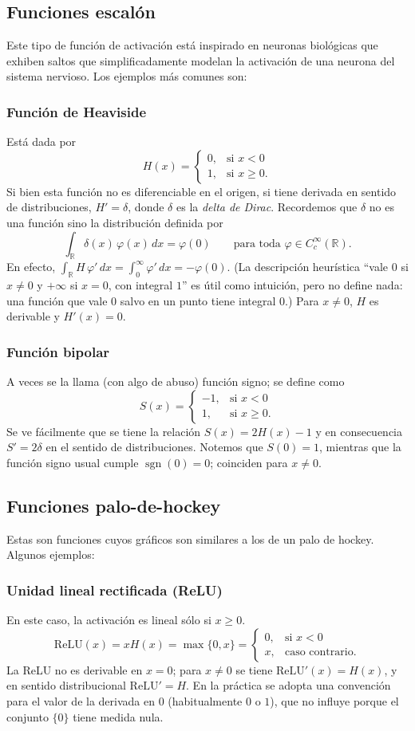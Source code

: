 \documentclass[12pt, a4paper]{amsbook}
\newcommand{\R}{{\mathbb R}}
\theoremstyle{remark}
\theoremstyle{definition}
\numberwithin{section}{chapter}
\numberwithin{subsection}{section}
\numberwithin{equation}{section}
\numberwithin{figure}{chapter}
\begin{document}
\subsection*{Funciones escalón} Este tipo de función de activación está inspirado en neuronas biológicas que exhiben saltos que simplificadamente modelan la activación de una neurona del sistema nervioso. Los ejemplos más comunes son:
\subsubsection*{Función de Heaviside} Está dada por
$$
H(x)=\begin{cases}
0, &\text{si } x<0\\
1, &\text{si } x\ge 0.
\end{cases}
$$
Si bien esta función no es diferenciable en el origen, si tiene derivada en sentido de distribuciones, $H'=\delta$, donde $\delta$ es la {\em delta de Dirac}. Recordemos que $\delta$ no es una función sino la distribución definida por
$$
\int_\R \delta(x)\,\varphi(x)\, dx = \varphi(0)\qquad\text{para toda } \varphi\in C_c^\infty(\R).
$$
En efecto, $\int_\R H\,\varphi'\,dx=\int_0^\infty\varphi'\,dx=-\varphi(0)$. (La descripción heurística ``vale $0$ si $x\neq0$ y $+\infty$ si $x=0$, con integral $1$'' es útil como intuición, pero no define nada: una función que vale $0$ salvo en un punto tiene integral $0$.) Para $x\neq0$, $H$ es derivable y $H'(x)=0$.

\subsubsection*{Función bipolar} A veces se la llama (con algo de abuso) función signo; se define como
$$
S(x)=\begin{cases}
-1, &\text{si } x<0\\
1, &\text{si } x\ge 0.
\end{cases}
$$
Se ve fácilmente que se tiene la relación $S(x) = 2H(x)-1$ y en consecuencia $S'=2\delta$ en el sentido de distribuciones. Notemos que $S(0)=1$, mientras que la función signo usual cumple $\operatorname{sgn}(0)=0$; coinciden para $x\ne0$.

\subsection*{Funciones palo-de-hockey} Estas son funciones cuyos gráficos son similares a los de un palo de hockey. Algunos ejemplos:
\subsubsection*{Unidad lineal rectificada (ReLU)} En este caso, la activación es lineal sólo si $x\ge 0$.
$$
\text{ReLU}(x) = x H(x)=\max\{0,x\} = \begin{cases} 0, &\text{si } x<0\\ x, & \text{caso contrario.}\end{cases}
$$
La ReLU no es derivable en $x=0$; para $x\neq0$ se tiene $\text{ReLU}'(x) = H(x)$, y en sentido distribucional $\text{ReLU}'=H$. En la práctica se adopta una convención para el valor de la derivada en $0$ (habitualmente $0$ o $1$), que no influye porque el conjunto $\{0\}$ tiene medida nula.
\end{document}
